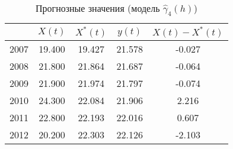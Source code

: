\begin{table}[ht]
\centering
\caption{Прогнозные значения (модель $ \widehat{\gamma}_4(h) $)} 
\label{table:lin-fit-adapt-prediction}
\begin{tabular}{r|cccc}
  \hline
 & $X(t)$ & $X^{*}(t)$ & $y(t)$ & $ X(t) - X^{*}(t) $ \\ 
  \hline
2007 & 19.400 & 19.427 & 21.578 & -0.027 \\ 
  2008 & 21.800 & 21.864 & 21.687 & -0.064 \\ 
  2009 & 21.900 & 21.974 & 21.797 & -0.074 \\ 
  2010 & 24.300 & 22.084 & 21.906 & 2.216 \\ 
  2011 & 22.800 & 22.193 & 22.016 & 0.607 \\ 
  2012 & 20.200 & 22.303 & 22.126 & -2.103 \\ 
   \hline
\end{tabular}
\end{table}
